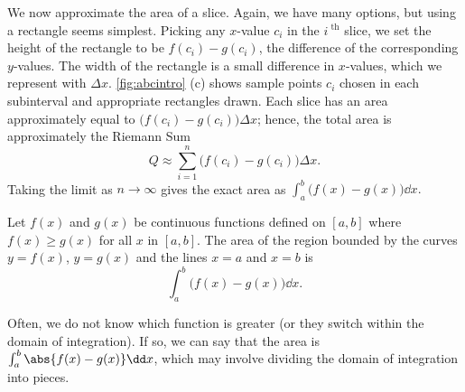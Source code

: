 We now approximate the area of a slice. Again, we have many options, but using a rectangle seems simplest. Picking any $x$-value $c_i$ in the $i^\text{ th}$ slice, we set the height of the rectangle to be $f(c_i)-g(c_i)$, the difference of the corresponding $y$-values. The width of the rectangle is a small difference in $x$-values, which we represent with $\Delta x$. \autoref{fig:abcintro} (c) shows sample points $c_i$ chosen in each subinterval and appropriate rectangles drawn.
Each slice has an area approximately equal to $\bigl(f(c_i)-g(c_i)\bigr)\Delta x$; hence, the total area is approximately the Riemann Sum\vspace{-.5\baselineskip}
\[Q \approx \sum_{i=1}^n \bigl(f(c_i)-g(c_i)\bigr)\Delta x.\]
Taking the limit as $n\to \infty$ gives the exact area as $\int_a^b \bigl(f(x)-g(x)\bigr)\dd x.$

\begin{theorem}\label{thm:areabetweencurves}%
Let $f(x)$ and $g(x)$ be continuous functions defined on $[a,b]$ where $f(x)\geq g(x)$ for all $x$ in $[a,b]$. The area of the region bounded by the curves $y=f(x)$, $y=g(x)$ and the lines $x=a$ and $x=b$ is 
\[\int_a^b \bigl(f(x)-g(x)\bigr)\dd x.\]
\end{theorem}

Often, we do not know which function is greater (or they switch within the domain of integration).  If so, we can say that the area is $\int_a^b\abs{f(x)-g(x)}\dd x$, which may involve dividing the domain of integration into pieces.


